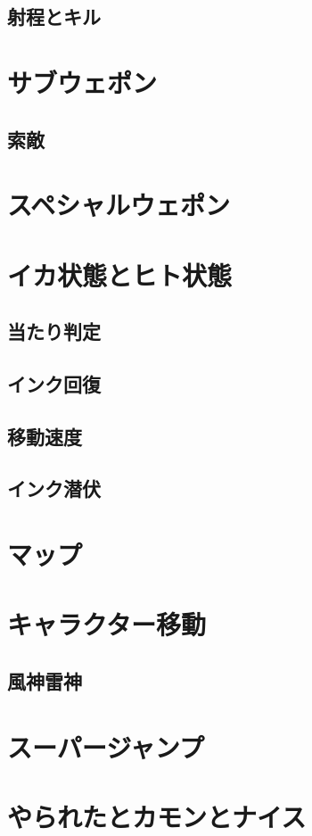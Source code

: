 \documentclass[a4paper,11pt]{jsbook}
\begin{document}
\section{射程とキル}
\chapter{サブウェポン}
\section{索敵}
\chapter{スペシャルウェポン}
\chapter{イカ状態とヒト状態}
\section{当たり判定}
\section{インク回復}
\section{移動速度}
\section{インク潜伏}
\chapter{マップ}
\chapter{キャラクター移動}
\section{風神雷神}
\chapter{スーパージャンプ}
\chapter{やられたとカモンとナイス}
\end{document}
